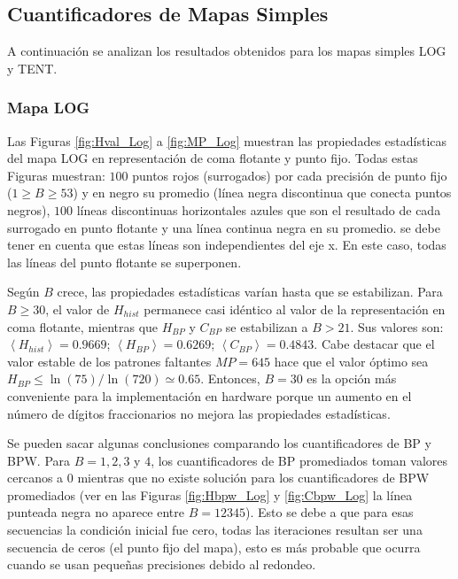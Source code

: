\subsection {Cuantificadores de Mapas Simples}
\label{subsec:SimpleMaps}

A continuación se analizan los resultados obtenidos para los mapas simples LOG y TENT.

\subsubsection{Mapa LOG}
\label{subsubsec:log}

Las Figuras \ref{fig:Hval_Log} a \ref{fig:MP_Log} muestran las propiedades estadísticas del mapa LOG en representación de coma flotante y punto fijo.
Todas estas Figuras muestran: $100$ puntos rojos (surrogados) por cada precisión de punto fijo ($1 \geq B \geq 53$) y en negro su promedio (línea negra discontinua que conecta puntos negros), $100$ líneas discontinuas horizontales azules que son el resultado de cada surrogado en punto flotante y una línea continua negra en su promedio.
se debe tener en cuenta que estas líneas son independientes del eje x.
En este caso, todas las líneas del punto flotante se superponen.

Según $B$ crece, las propiedades estadísticas varían hasta que se estabilizan.
Para $B \geq 30$, el valor de $H_{hist}$ permanece casi idéntico al valor de la representación en coma flotante, mientras que $H_{BP}$ y $C_{BP}$ se estabilizan a $B > 21$.
Sus valores son: $\left\langle H_{hist}\right\rangle = 0.9669$; $\left\langle H_{BP}\right\rangle = 0.6269$; $\left\langle C_{BP}\right\rangle = 0.4843$.
Cabe destacar que el valor estable de los patrones faltantes $MP = 645$ hace que el valor óptimo sea $H_{BP} \leq \ln(75)/\ln(720) \simeq 0.65$.
Entonces, $B = 30$ es la opción más conveniente para la implementación en hardware porque un aumento en el número de dígitos fraccionarios no mejora las propiedades estadísticas.

Se pueden sacar algunas conclusiones comparando los cuantificadores de BP y BPW.
Para $B = 1, 2, 3$ y $4$, los cuantificadores de BP promediados toman valores cercanos a $0$ mientras que no existe solución para los cuantificadores de BPW promediados (ver en las Figuras \ref{fig:Hbpw_Log} y \ref{fig:Cbpw_Log} la línea punteada negra no aparece entre $B = {1 2 3 4 5}$).
Esto se debe a que para esas secuencias la condición inicial fue cero, todas las iteraciones resultan ser una secuencia de ceros (el punto fijo del mapa), esto es más probable que ocurra cuando se usan pequeñas precisiones debido al redondeo.

